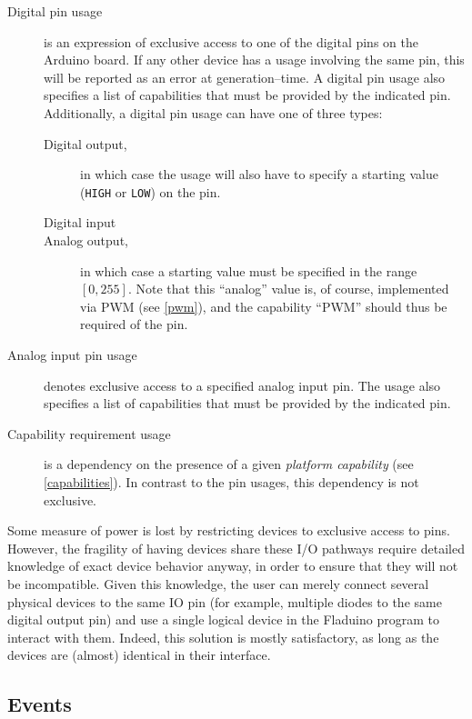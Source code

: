 \documentclass[a4paper, oneside, final]{memoir}
\begin{document}
\begin{description}
\item[Digital pin usage] is an expression of exclusive access to one
  of the digital pins on the Arduino board.  If any other device has a
  usage involving the same pin, this will be reported as an error at
  generation--time.  A digital pin usage also specifies a list of
  capabilities that must be provided by the indicated pin.
  Additionally, a digital pin usage can have one of three types:
  \begin{description}
  \item[Digital output,] in which case the usage will also have to
    specify a starting value (\texttt{HIGH} or \texttt{LOW}) on the
    pin.
  \item[Digital input]
  \item[Analog output,] in which case a starting value must be
    specified in the range $[0,255]$.  Note that this ``analog'' value
    is, of course, implemented via PWM (see \ref{pwm}), and the
    capability ``PWM'' should thus be required of the pin.
  \end{description}
\item[Analog input pin usage] denotes exclusive access to a specified
  analog input pin.  The usage also specifies a list of capabilities
  that must be provided by the indicated pin.
\item[Capability requirement usage] is a dependency on the presence of
  a given \textit{platform capability} (see \ref{capabilities}).  In
  contrast to the pin usages, this dependency is not exclusive.
\end{description}

Some measure of power is lost by restricting devices to exclusive
access to pins.  However, the fragility of having devices share these
I/O pathways require detailed knowledge of exact device behavior
anyway, in order to ensure that they will not be incompatible.  Given
this knowledge, the user can merely connect several physical devices
to the same IO pin (for example, multiple diodes to the same digital
output pin) and use a single logical device in the Fladuino program to
interact with them.  Indeed, this solution is mostly satisfactory, as
long as the devices are (almost) identical in their interface.

\subsection{Events}
\end{document}
